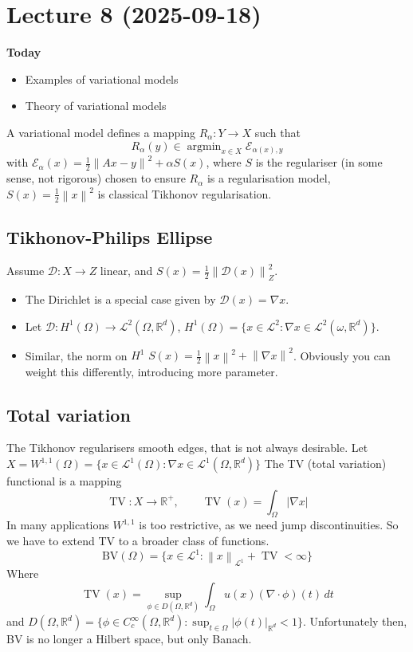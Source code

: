 \documentclass[12pt]{article}
\theoremstyle{definition}
\newcommand{\real}{\mathbb{R}}   %
\newcommand{\abs}[1]{\left|#1\right|}
\DeclareMathOperator{\argmin}{argmin}
\DeclareMathOperator{\TV}{TV}
\newcommand\norm[1]{\left\lVert#1\right\rVert}
\begin{document}
\newpage
\section{Lecture 8 (2025-09-18)}

\textbf{Today}
\begin{itemize}
    \item Examples of variational models
    \item Theory of variational models
\end{itemize}
A variational model defines a mapping $R_\alpha:Y\to X$ such that 
\begin{equation*}
    R_\alpha(y) \in \argmin_{x\in X} \mathcal{E}_{\alpha(x),y}
\end{equation*}
with $\mathcal{E}_\alpha(x) = \frac{1}{2}\norm{Ax-y}^2 +\alpha S(x)$, where $S$ is the regulariser (in some sense, not rigorous) chosen to ensure $R_\alpha$ is a regularisation model, $S(x)=\frac{1}{2}\norm{x}^2$ is classical Tikhonov regularisation.

\subsection{Tikhonov-Philips Ellipse}
Assume $\mathscr{D}:X\to Z$ linear, and $S(x) = \frac{1}{2}\norm{\mathscr{D}(x)}_Z^2$. 
\begin{itemize}
    \item The Dirichlet is a special case given by $\mathscr{D}(x) = \nabla x$.
    \item Let $\mathscr{D}:H^1(\Omega) \to \mathcal{L}^2(\Omega, \real^d)$, $H^1(\Omega) = \{x\in \mathcal{L}^2:\nabla x\in \mathcal{L}^2(\omega,\real^d)\}$.
    \item Similar, the norm on $H^1$ $S(x) = \frac{1}{2} \norm{x}^2+\norm{\nabla x}^2$. Obviously you can weight this differently, introducing more parameter.
\end{itemize}

\subsection{Total variation}
The Tikhonov regularisers smooth edges, that is not always desirable. Let $X=W^{1,1}(\Omega) = \{x\in\mathcal{L}^1(\Omega): \nabla x\in\mathcal{L}^1(\Omega,\real^d)\}$ The TV (total variation) functional is a mapping
\begin{equation*}
    \TV:X\to\real^+, \qquad \TV(x) = \int_\Omega \abs{\nabla x}
\end{equation*} 
In many applications $W^{1,1}$ is too restrictive, as we need jump discontinuities. So we have to extend TV to a broader class of functions.
\begin{equation*}
    \text{BV}(\Omega)= \{x\in \mathcal{L}^1:\norm{x}_{\mathcal{L}^1}+\TV <\infty\}
\end{equation*}
Where 
\begin{equation*}
    \TV(x) = \sup_{\phi\in D(\Omega,\real^d)}\int_\Omega u(x) (\nabla\cdot \phi)(t)\,dt
\end{equation*}
and $D(\Omega,\real^d) = \{\phi\in C_c^\infty(\Omega, \real^d) : \sup_{t\in\Omega} \abs{\phi(t)}_{\real^d}<1\}$. Unfortunately then, BV is no longer a Hilbert space, but only Banach. 
\end{document}
